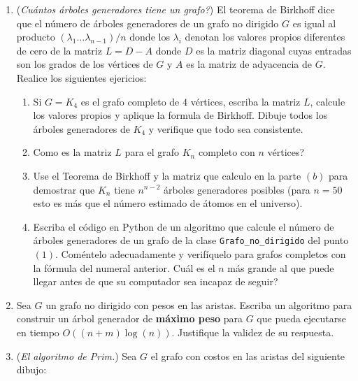 \documentclass[12pt, a4paper]{article}
\begin{document}
\begin{enumerate}
\item ({\it Cuántos árboles generadores tiene un grafo?}) El teorema de Birkhoff dice que el número de árboles generadores de un grafo no dirigido $G$ es igual al producto $(\lambda_1\dots\lambda_{n-1})/n$ donde los $\lambda_i$ denotan los valores propios diferentes de cero de la matriz $L=D-A$ donde $D$ es la matriz diagonal cuyas entradas son los grados de los vértices de $G$ y $A$ es la matriz de adyacencia de $G$. Realice los siguientes ejericios:
\begin{enumerate}
\item Si $G=K_4$ es el grafo completo de $4$ vértices, escriba la matriz $L$, calcule los valores propios y aplique la formula de Birkhoff. Dibuje todos los árboles generadores de $K_4$ y verifique que todo sea consistente.
\item Como es la matriz $L$ para el grafo $K_n$ completo con $n$ vértices?
\item Use el Teorema de Birkhoff y la matriz que calculo en la parte $(b)$ para demostrar que $K_n$ tiene $n^{n-2}$ árboles generadores posibles (para $n=50$ esto es más que el número estimado de átomos en el universo).
\item Escriba el código en Python de un algoritmo que calcule el número de árboles generadores de un grafo de la clase \verb!Grafo_no_dirigido! del punto $(1)$. Coméntelo adecuadamente y verifíquelo para grafos completos con la fórmula del numeral anterior. Cuál es el $n$ más grande al que puede llegar antes de que su computador sea incapaz de seguir?
\end{enumerate}
\item Sea $G$ un grafo no dirigido con pesos en las aristas. Escriba un algoritmo para construir un árbol generador de {\bf máximo peso} para $G$ que pueda ejecutarse en tiempo $O((n+m)\log(n))$. Justifique la validez de su respuesta.
\newpage
\item ({\it El algoritmo de Prim.}) Sea $G$ el grafo con costos en las aristas del siguiente dibujo:
\begin{center}

\end{center}
\end{enumerate}
\end{document}

